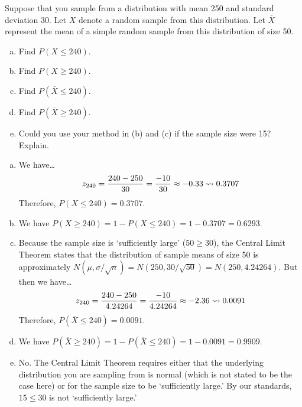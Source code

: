 \documentclass[11pt,letterpaper]{article}
\begin{document}

 Suppose that you sample from a distribution with mean 250 and standard deviation 30. Let $X$ denote a random sample from this distribution. Let $\overline{X}$ represent the mean of a simple random sample from this distribution of size 50.
	\begin{enumerate}[(a)]
	\item Find $P(X \leq 240)$.
	\item Find $P(X \geq 240)$.
	\item Find $P(\overline{X} \leq 240)$.
	\item Find $P(\overline{X} \geq 240)$.
	\item Could you use your method in (b) and (c) if the sample size were 15? Explain. 
	\end{enumerate} \pspace

\sol 
\begin{enumerate}[(a)]
\item We have\dots
	\[
	z_{240}= \dfrac{240 - 250}{30}= \dfrac{-10}{30} \approx -0.33 \rightsquigarrow 0.3707
	\]
Therefore, $P(X \leq 240)= 0.3707$. \pspace

\item We have $P(X \geq 240)= 1 - P(X \leq 240)= 1 - 0.3707= 0.6293$. \pspace

\item Because the sample size is `sufficiently large' ($50 \geq 30$), the Central Limit Theorem states that the distribution of sample means of size 50 is approximately $N(\mu, \sigma/\sqrt{n})= N(250, 30/\sqrt{50})= N(250, 4.24264)$. But then we have\dots
	\[
	z_{240}= \dfrac{240 - 250}{4.24264}= \dfrac{-10}{4.24264} \approx -2.36 \rightsquigarrow 0.0091
	\]
Therefore, $P(\overline{X} \leq 240)= 0.0091$. \pspace

\item We have $P(\overline{X} \geq 240)= 1 - P(\overline{X} \leq 240)= 1 - 0.0091= 0.9909$. \pspace

\item No. The Central Limit Theorem requires either that the underlying distribution you are sampling from is normal (which is not stated to be the case here) or for the sample size to be `sufficiently large.' By our standards, $15 \leq 30$ is not `sufficiently large.' 
\end{enumerate}



\newpage
\end{document}
